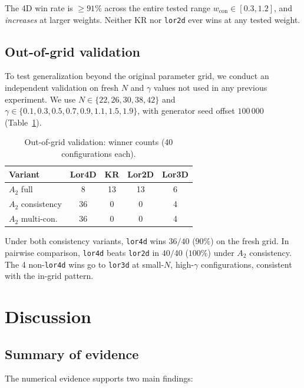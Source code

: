 \documentclass[12pt,a4paper]{article}
\begin{document}
The 4D win rate is $\geq 91\%$ across the entire tested range
$w_{\text{con}} \in [0.3, 1.2]$, and \emph{increases} at larger weights.
Neither KR nor \texttt{lor2d} ever wins at any tested weight.

\subsection{Out-of-grid validation}
\label{sec:oog}

To test generalization beyond the original parameter grid, we conduct an
independent validation on fresh $N$ and $\gamma$ values not used in any
previous experiment. We use $N \in \{22, 26, 30, 38, 42\}$ and
$\gamma \in \{0.1, 0.3, 0.5, 0.7, 0.9, 1.1, 1.5, 1.9\}$, with generator
seed offset $100\,000$ (Table~\ref{tab:oog}).

\begin{table}[h]
\centering
\caption{Out-of-grid validation: winner counts (40 configurations each).}
\label{tab:oog}
\begin{tabular}{lcccc}
\toprule
\textbf{Variant} & \textbf{Lor4D} & \textbf{KR} & \textbf{Lor2D} &
\textbf{Lor3D} \\
\midrule
$A_2$ full & 8 & 13 & 13 & 6 \\
$A_2$ consistency & 36 & 0 & 0 & 4 \\
$A_2$ multi-con. & 36 & 0 & 0 & 4 \\
\bottomrule
\end{tabular}
\end{table}

Under both consistency variants, \texttt{lor4d} wins $36/40$ ($90\%$) on the
fresh grid. In pairwise comparison, \texttt{lor4d} beats \texttt{lor2d} in
$40/40$ ($100\%$) under $A_2$ consistency. The 4 non-\texttt{lor4d} wins go to
\texttt{lor3d} at small-$N$, high-$\gamma$ configurations, consistent with the
in-grid pattern.

\section{Discussion}
\label{sec:discussion}

\subsection{Summary of evidence}

The numerical evidence supports two main findings:
\end{document}

